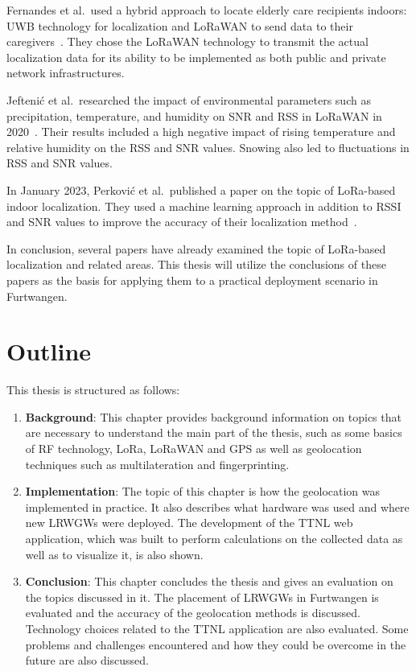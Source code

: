 Fernandes et al.\ used a hybrid approach to locate elderly care recipients indoors: \ac{UWB} technology for localization and \ac{LoRaWAN} to send data to their caregivers~\cite{fernandes_hybrid_2020}.
They chose the \ac{LoRaWAN} technology to transmit the actual localization data for its ability to be implemented as both public and private network infrastructures.

Jeftenić et al.\ researched the impact of environmental parameters such as precipitation, temperature, and humidity on \ac{SNR} and \ac{RSS} in \ac{LoRaWAN} in 2020~\cite{jeftenic_impact_2020}.
Their results included a high negative impact of rising temperature and relative humidity on the \ac{RSS} and \ac{SNR} values.
Snowing also led to fluctuations in \ac{RSS} and \ac{SNR} values.

In January 2023, Perković et al.\ published a paper on the topic of \ac{LoRa}-based indoor localization.
They used a machine learning approach in addition to \ac{RSSI} and \ac{SNR} values to improve the accuracy of their localization method~\cite{perkovic_machine_2023}.

In conclusion, several papers have already examined the topic of \ac{LoRa}-based localization and related areas.
This thesis will utilize the conclusions of these papers as the basis for applying them to a practical deployment scenario in Furtwangen.

\section{Outline}

This thesis is structured as follows:

\begin{enumerate}
      \item \textbf{Background}:
            This chapter provides background information on topics that are necessary to understand the main part of the thesis, such as some basics of \ac{RF} technology, \ac{LoRa}, \ac{LoRaWAN} and \ac{GPS} as well as geolocation techniques such as multilateration and fingerprinting.
      \item \textbf{Implementation}:
            The topic of this chapter is how the geolocation was implemented in practice.
            It also describes what hardware was used and where new \aclp{LRWGW} were deployed.
            The development of the \ac{TTNL} web application, which was built to perform calculations on the collected data as well as to visualize it, is also shown.
      \item \textbf{Conclusion}:
            This chapter concludes the thesis and gives an evaluation on the topics discussed in it.
            The placement of \aclp{LRWGW} in Furtwangen is evaluated and the accuracy of the geolocation methods is discussed.
            Technology choices related to the \ac{TTNL} application are also evaluated.
            Some problems and challenges encountered and how they could be overcome in the future are also discussed.
\end{enumerate}


